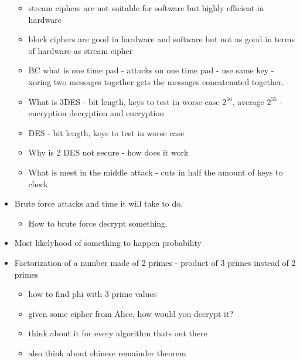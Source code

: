 \documentclass[12pt]{amsart}
\begin{document}
\begin{itemize}
\begin{itemize}
	\item{}stream ciphers are not suitable for software but highly efficient in hardware\\
	\item{}block ciphers are good in hardware and software but not as good in terms of hardware as stream cipher\\
	\item{}BC what is one time pad - attacks on one time pad - use same key - xoring two messages together gets the messages concatenated together.\\
	\item{}What is 3DES - bit length, keys to test in worse case $2^{56}$, average $2^{55}$ - encryption decryption and encryption\\
	\item{}DES - bit length, keys to test in worse case \\
	\item{}Why is 2 DES not secure - how does it work\\
	\item{}What is meet in the middle attack - cuts in half the amount of keys to check\\
\end{itemize}
\item{}Brute force attacks and time it will take to do.\\
	\begin{itemize}
	\item{}How to brute force decrypt something.\\
	\end{itemize}
\item{}Most likelyhood of something to happen probability\\
\item{}Factorization of a number made of 2 primes - product of 3 primes instead of 2 primes\\
	\begin{itemize}
	\item{}how to find phi with 3 prime values\\
	\item{}given some cipher from Alice, how would you decrypt it?\\
	\item{}think about it for every algorithm thats out there\\
	\item{}also think about chinese remainder theorem\\
	\end{itemize}

\end{itemize}
\end{document}
